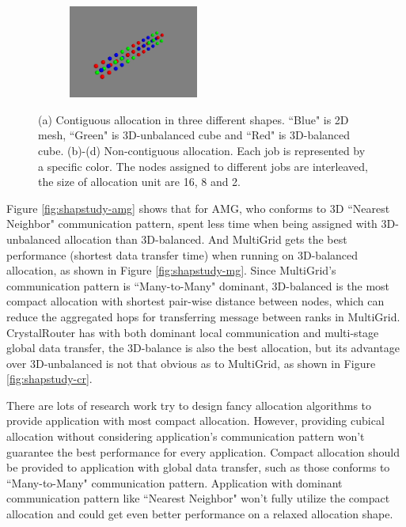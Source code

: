\documentclass[conference]{IEEEtran}
\begin{document}
\begin{figure}[t!]
\begin{subfigure}[t]{0.2\textwidth}
        \caption{ }
        \label{fig:noncont_sub2}
    \end{subfigure}%
    \begin{subfigure}[t]{0.2\textwidth}
        \centering
        \includegraphics[height=1.2in]{figs/allocshape/unitsize/unit2}
        \caption{ }
        \label{fig:noncont_sub3}
    \end{subfigure}%
    \caption{(a) Contiguous allocation in three different shapes. ``Blue" is 2D mesh, ``Green" is 3D-unbalanced cube and ``Red" is 3D-balanced cube. (b)-(d) Non-contiguous allocation. Each job is represented by a specific color. The nodes assigned to different jobs are interleaved, the size of allocation unit are 16, 8 and 2.}
\end{figure}




Figure \ref{fig:shapstudy-amg} shows that for AMG, who conforms to 3D ``Nearest Neighbor" communication pattern, spent less time when being assigned with 3D-unbalanced allocation than 3D-balanced. And MultiGrid gets the best performance (shortest data transfer time) when running on 3D-balanced allocation, as shown in Figure \ref{fig:shapstudy-mg}. Since MultiGrid's communication pattern is ``Many-to-Many" dominant, 3D-balanced is the most compact allocation with shortest pair-wise distance between nodes, which can reduce the aggregated hops for transferring message between ranks in MultiGrid. CrystalRouter has with both dominant local communication and multi-stage global data transfer, the 3D-balance is also the best allocation, but its advantage over 3D-unbalanced is not that obvious as to MultiGrid, as shown in Figure \ref{fig:shapstudy-cr}.

There are lots of research work try to design fancy allocation algorithms to provide application with most compact allocation. However, providing cubical allocation without considering application's communication pattern won't guarantee the best performance for every application. Compact allocation should be provided to application with global data transfer, such as those conforms to ``Many-to-Many" communication pattern. Application with dominant communication pattern like ``Nearest Neighbor" won't fully utilize the compact allocation and could get even better performance on a relaxed allocation shape. 
\end{document}
